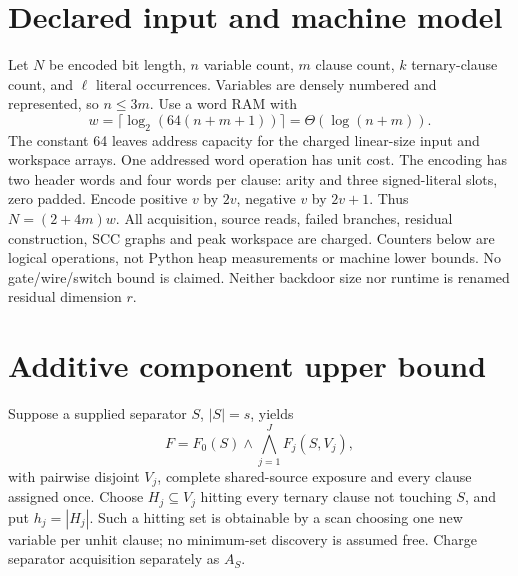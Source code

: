 \documentclass[11pt]{article}
\begin{document}
\section{Declared input and machine model}
Let $N$ be encoded bit length, $n$ variable count, $m$ clause count, $k$ ternary-clause count, and $\ell$ literal occurrences. Variables are densely numbered and represented, so $n\le3m$. Use a word RAM with
\[
w=\lceil\log_2(64(n+m+1))\rceil=\Theta(\log(n+m)).
\]
The constant 64 leaves address capacity for the charged linear-size input and workspace arrays. One addressed word operation has unit cost. The encoding has two header words and four words per clause: arity and three signed-literal slots, zero padded. Encode positive $v$ by $2v$, negative $v$ by $2v+1$. Thus $N=(2+4m)w$. All acquisition, source reads, failed branches, residual construction, SCC graphs and peak workspace are charged. Counters below are logical operations, not Python heap measurements or machine lower bounds. No gate/wire/switch bound is claimed. Neither backdoor size nor runtime is renamed residual dimension $r$.

\section{Additive component upper bound}
Suppose a supplied separator $S$, $|S|=s$, yields
\[
F=F_0(S)\wedge\bigwedge_{j=1}^{J}F_j(S,V_j),
\]
with pairwise disjoint $V_j$, complete shared-source exposure and every clause assigned once. Choose $H_j\subseteq V_j$ hitting every ternary clause not touching $S$, and put $h_j=|H_j|$. Such a hitting set is obtainable by a scan choosing one new variable per unhit clause; no minimum-set discovery is assumed free. Charge separator acquisition separately as $A_S$.
\end{document}
